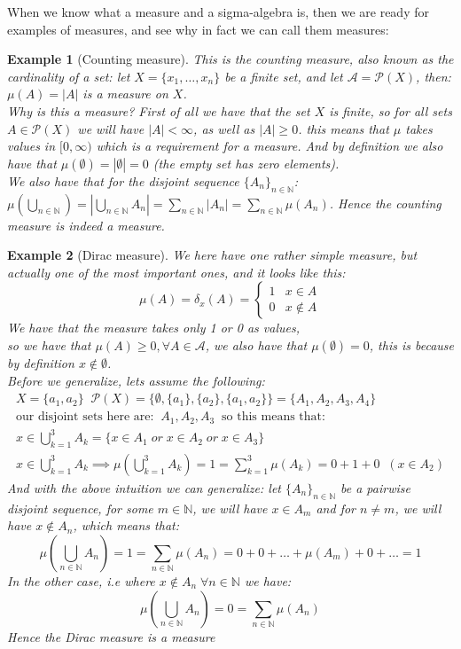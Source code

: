 \documentclass{article}
\newcommand{\N}{\mathbb{N}}
\newcommand{\A}{\mathcal{A}}
\newtheorem{ex}{Example}
\begin{document}
When we know what a measure and a sigma-algebra is, then we are ready for examples of measures, and see why in fact we can call them measures:  

\begin{ex}[Counting measure]
This is the counting measure, also known as the cardinality of a set: let $X = \{x_{1}, \dots, x_{n}\}$ be a finite set, and let $\A = \mathcal{P}(X)$, then: $\mu(A) = |A|$ is a measure on $X$. \\ 
Why is this a measure? First of all we have that the set $X$ is finite, so for all sets $A\in \mathcal{P}(X)$ we will have $|A| < \infty$, as well as $|A| \geq 0$. this means that $\mu$ takes values in $[0, \infty)$ which is a requirement for a measure. And by definition we also have that $\mu(\emptyset) = |\emptyset| = 0$ (the empty set has zero elements).\\ 
We also have that for the disjoint sequence $\{A_{n}\}_{n\in \N}$: $\mu\left(\bigcup_{n\in \N}\right) = \left|\bigcup_{n\in \N}A_{n} \right|
= \sum_{n\in \N}|A_{n}| = \sum_{n\in \N}\mu(A_{n})$. 
Hence the counting measure is indeed a measure.
\end{ex}  

\begin{ex}[Dirac measure]
We here have one rather simple measure, but actually one of the most important ones, and it looks like this: 
\[ \mu(A) = \delta_{x}(A) =  \begin{cases}
      1 & x \in A\\
      0 & x \not\in A
    \end{cases} 
\] 
We have that the measure takes only 1 or 0 as values,\\
so we have that $\mu(A) \geq 0, \forall A\in \A$, we also have that $\mu(\emptyset) = 0$, this is because by definition $x\not\in \emptyset$. \\
Before we generalize, lets assume the following: 
\begin{align*}
X = \{a_{1},a_{2}\}\;\; \mathcal{P}(X) = \{\emptyset, \{a_{1}\}, \{a_{2}\}, \{a_{1}, a_{2}\}\} = \{A_{1}, A_{2}, A_{3}, A_{4}\} \\ 
\text{our disjoint sets here are:}\;\; A_{1}, A_{2}, A_{3}\;\; \text{so this means that:}\\ 
x \in \bigcup_{k=1}^{3}A_{k} = \{x\in A_{1} \;or\; x\in A_{2} \;or\; x\in A_{3}\} \\ 
x \in \bigcup_{k=1}^{3}A_{k} \implies \mu\left(\bigcup_{k=1}^{3} A_{k}\right) = 1 = \sum_{k=1}^{3}\mu(A_{k}) = 0 + 1 + 0 \;\;(x\in A_{2})
\end{align*}
And with the above intuition we can generalize: let $\{A_{n}\}_{n\in \N}$ be a pairwise disjoint sequence, for some $m\in \N$, we will have $x\in A_{m}$ and for $n\neq m$, we will have $x\not\in A_{n}$, which means that: 
\[\mu\left(\bigcup_{n\in \N}A_{n}\right) = 1 = \sum_{n\in \N}\mu(A_{n}) = 0 + 0+\dots + \mu(A_{m}) + 0 + \dots = 1
\] 
In the other case, i.e where $x \not\in A_{n} \; \forall n\in \N$ we have: 
\[\mu\left(\bigcup_{n\in \N}A_{n}\right) = 0 = \sum_{n\in \N}\mu(A_{n})
\] 
Hence the Dirac measure is a measure 
\end{ex} 
\end{document}
